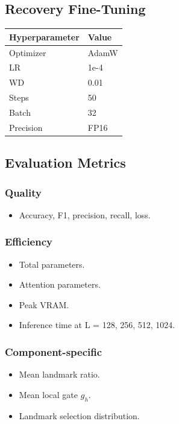 \subsection{Recovery Fine-Tuning}

\begin{table}[H]
\centering
\small
\begin{tabular}{ll}
\toprule
\textbf{Hyperparameter} & \textbf{Value} \\
\midrule
Optimizer & AdamW \\
LR & 1e-4 \\
WD & 0.01 \\
Steps & 50 \\
Batch & 32 \\
Precision & FP16 \\
\bottomrule
\end{tabular}
\end{table}

\subsection{Evaluation Metrics}

\subsubsection{Quality}
\begin{itemize}
\item Accuracy, F1, precision, recall, loss.

\end{itemize}
\subsubsection{Efficiency}
\begin{itemize}
\item Total parameters.
\item Attention parameters.
\item Peak VRAM.
\item Inference time at L = 128, 256, 512, 1024.

\end{itemize}
\subsubsection{Component-specific}
\begin{itemize}
\item Mean landmark ratio.
\item Mean local gate $g_h$.
\item Landmark selection distribution.

\end{itemize}
